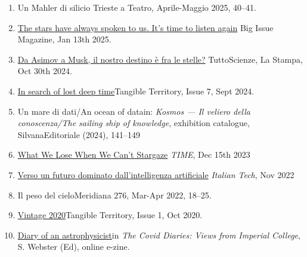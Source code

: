 \begin{enumerate}
\item 
{}
{Un Mahler di silicio}
{Trieste a Teatro, Aprile-Maggio 2025, 40–41}. 

\item 
{}
{\href{https://gb.readly.com/magazines/the-big-issue/2025-01-13/677fd670a217e920934f939a?srsltid=AfmBOorf4xti_cM_bmMj9WiGM6VPXmm7EnwGZDr1s_z8JdeJxGpdUWnN}{The stars have always spoken to us. It's time to listen again}}
{Big Issue Magazine, Jan 13th 2025}. 

\item
{}
{\href{https://www.lastampa.it/tuttoscienze/2024/10/30/news/da_asimov_e_musk_il_destino_dell_umanita_e_fra_le_stelle-14756874/}{Da Asimov a Musk, il nostro destino è fra le stelle?}}
{TuttoScienze, La Stampa, Oct 30th 2024}. 

\item 
{}
{\href{ https://tangibleterritory.art/journal/issue-7-content/in-search-of-lost-deep-time/}{In search of lost deep time}}{Tangible Territory, Issue 7, Sept 2024}. 

\item 
{}
{Un mare di dati/An ocean of data}{in: {\em Kosmos --- Il veliero della conoscenza/The sailing ship of knowledge}, exhibition catalogue, SilvanaEditoriale (2024), 141–149}

\item
{}
{\href{https://time.com/6450092/stars-importance-essay/}{What We Lose When We Can't Stargaze}}
{{\em TIME}, Dec 15th 2023}

\item
{}
{\href{https://www.italian.tech/blog/lettere/2022/11/11/news/verso_un_futuro_dominato_dallintelligenza_artificiale-373933318/}{Verso un futuro dominato dall'intelligenza artificiale}}
{{\em Italian Tech}, Nov 2022}

\item
{}
{Il peso del cielo}{Meridiana 276, Mar-Apr 2022, 18–25}.

\item 
{}
{\href{https://tangibleterritory.art/journal/issue1/roberto-trotta-vintage-2020/}{Vintage 2020}}{Tangible Territory, Issue 1, Oct 2020}. 

\item 
{}
{\href{https://issuu.com/scuunit/docs/coviddiaries}{Diary of an astrophysicist}}{in {\em The Covid Diaries: Views from Imperial College}, S. Webster (Ed), online e-zine}. 


\end{enumerate}
